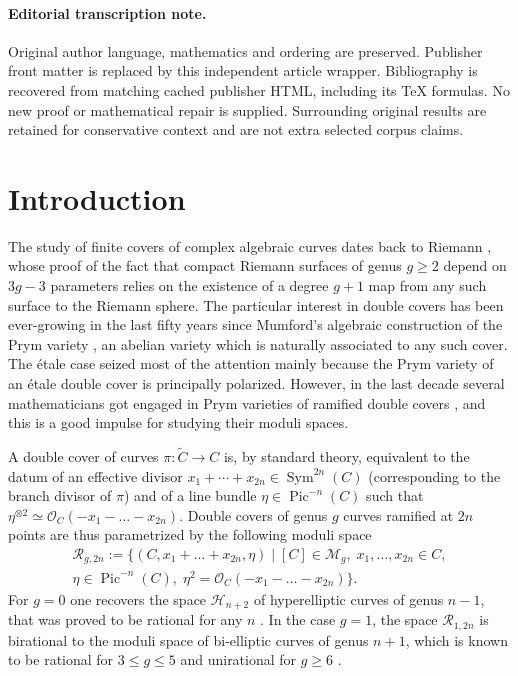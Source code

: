 \documentclass[11pt]{article}
\theoremstyle{plain}
\theoremstyle{definition}
\DeclareMathOperator{\Pic}{Pic}
\DeclareMathOperator{\Sym}{Sym}
\newcommand\M{{\mathcal M}}
\newcommand\R{{\mathcal R}}
\begin{document}
\paragraph{Editorial transcription note.}
Original author language, mathematics and ordering are preserved. Publisher front matter is replaced by this independent article wrapper. Bibliography is recovered from matching cached publisher HTML, including its TeX formulas. No new proof or mathematical repair is supplied. Surrounding original results are retained for conservative context and are not extra selected corpus claims.
\clearpage

\section{Introduction}
The study of finite covers of complex algebraic curves dates back to Riemann \cite{Ri}, whose proof of the fact that compact Riemann surfaces of genus $g\geq 2$ depend on $3g-3$ parameters relies on the existence of a degree $g+1$ map from any such surface to the Riemann sphere. The particular interest in double covers has been ever-growing in the last fifty years since Mumford's algebraic construction of the Prym variety \cite{Mu}, an abelian variety which is naturally associated  to any such cover. The étale case seized most of the attention mainly because the Prym variety of an étale double cover is principally polarized. However, in the last decade several mathematicians got engaged in Prym varieties of ramified double covers \cite{MP,NOV,NO}, and this is a good impulse for studying their moduli spaces.

A double cover of curves $\pi:\widetilde C\to C$ is, by standard theory, equivalent to the datum of an effective divisor $x_1+\cdots+x_{2n}\in \Sym^{2n}(C)$ (corresponding to the branch divisor of $\pi$) and of a line bundle $\eta\in \Pic^{-n}(C)$ such that $\eta^{\otimes 2}\simeq \mathcal O_C(-x_1-\ldots-x_{2n})$. Double covers of genus $g$ curves ramified at $2n$ points are thus parametrized by the following moduli space
\begin{multline*}
\mathcal{R}_{g,2n}:= \Big\{(C,x_1+\ldots+x_{2n},\eta)\mid [C]\in\M_g,\; x_1,\ldots,x_{2n} \in C,\\
\eta\in\Pic^{-n}(C),\; \eta^2=\mathcal O_C(-x_1-\ldots-x_{2n}) \Big\}.
\end{multline*}
For $g=0$ one recovers the space $\mathcal H_{n+2}$ of hyperelliptic curves of genus $n-1$, that was proved to be rational for any $n$ \cite{Bo,K1,K2}. In the case $g=1$, the space $\R_{1,2n}$ is birational to the moduli space of bi-elliptic curves of genus $n+1$, which is known to be rational for $3\leq g\leq 5$ \cite{BdC1,BdC2,CdC1} and unirational for $g\geq 6$ \cite{CdC2}.
\end{document}
